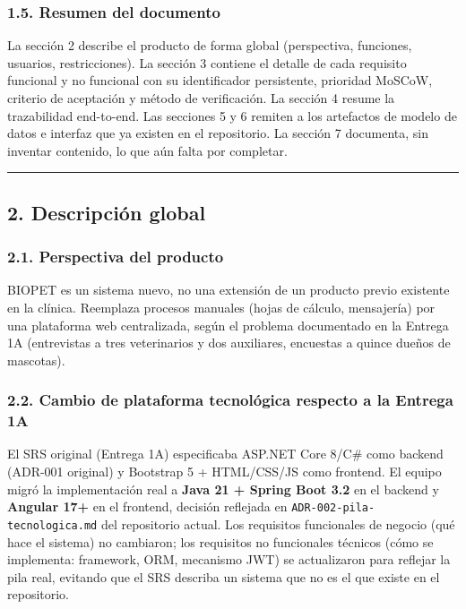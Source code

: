 \documentclass[
]{article}
\begin{document}
\hypertarget{resumen-del-documento}{%
\subsubsection{1.5. Resumen del documento}\label{resumen-del-documento}}

La sección 2 describe el producto de forma global (perspectiva,
funciones, usuarios, restricciones). La sección 3 contiene el detalle de
cada requisito funcional y no funcional con su identificador
persistente, prioridad MoSCoW, criterio de aceptación y método de
verificación. La sección 4 resume la trazabilidad end-to-end. Las
secciones 5 y 6 remiten a los artefactos de modelo de datos e interfaz
que ya existen en el repositorio. La sección 7 documenta, sin inventar
contenido, lo que aún falta por completar.

\begin{center}\rule{0.5\linewidth}{0.5pt}\end{center}

\hypertarget{descripciuxf3n-global}{%
\subsection{2. Descripción global}\label{descripciuxf3n-global}}

\hypertarget{perspectiva-del-producto}{%
\subsubsection{2.1. Perspectiva del
producto}\label{perspectiva-del-producto}}

BIOPET es un sistema nuevo, no una extensión de un producto previo
existente en la clínica. Reemplaza procesos manuales (hojas de cálculo,
mensajería) por una plataforma web centralizada, según el problema
documentado en la Entrega 1A (entrevistas a tres veterinarios y dos
auxiliares, encuestas a quince dueños de mascotas).

\hypertarget{cambio-de-plataforma-tecnoluxf3gica-respecto-a-la-entrega-1a}{%
\subsubsection{2.2. Cambio de plataforma tecnológica respecto a la
Entrega
1A}\label{cambio-de-plataforma-tecnoluxf3gica-respecto-a-la-entrega-1a}}

El SRS original (Entrega 1A) especificaba ASP.NET Core 8/C\# como
backend (ADR-001 original) y Bootstrap 5 + HTML/CSS/JS como frontend. El
equipo migró la implementación real a \textbf{Java 21 + Spring Boot 3.2}
en el backend y \textbf{Angular 17+} en el frontend, decisión reflejada
en \texttt{ADR-002-pila-tecnologica.md} del repositorio actual. Los
requisitos funcionales de negocio (qué hace el sistema) no cambiaron;
los requisitos no funcionales técnicos (cómo se implementa: framework,
ORM, mecanismo JWT) se actualizaron para reflejar la pila real, evitando
que el SRS describa un sistema que no es el que existe en el
repositorio.
\end{document}
